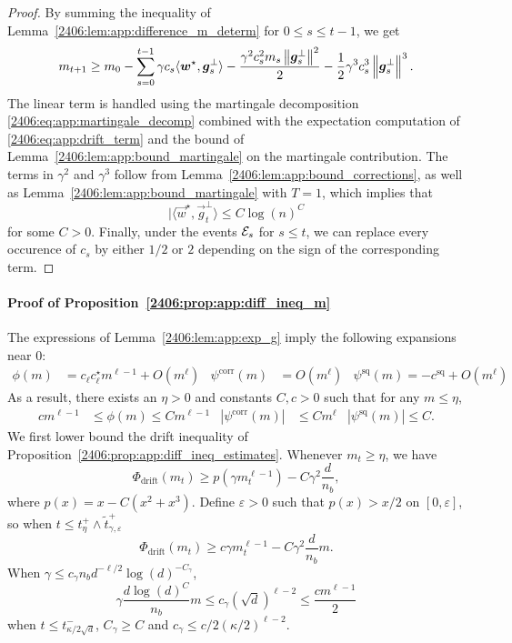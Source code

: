 \begin{proof}
    By summing the inequality of Lemma~\ref{2406:lem:app:difference_m_determ} for $0 \leq s \leq t-1$, we get
    \begin{equation}
        m_{t+1} \geq m_0 - \sum_{s=0}^{t-1} \gamma c_s \langle {\boldsymbol{w}}^\star,{\boldsymbol{g}}_s^\bot \rangle - \frac{\gamma^2 c_s^2 m_s \left\lVert {\boldsymbol{g}}_s^\bot\right\rVert^2}{2} - \frac12\gamma^3 c_s^3 \left\lVert {\boldsymbol{g}}_s^\bot\right\rVert^3.
    \end{equation}
    The linear term is handled using the martingale decomposition \eqref{2406:eq:app:martingale_decomp} combined with the expectation computation of \eqref{2406:eq:app:drift_term} and the bound of Lemma~\ref{2406:lem:app:bound_martingale} on the martingale contribution. The terms in $\gamma^2$ and $\gamma^3$ follow from Lemma~\ref{2406:lem:app:bound_corrections}, as well as Lemma~\ref{2406:lem:app:bound_martingale} with $T = 1$, which implies that
    \[ |\langle \vec{w}^\star, \vec{g}_t^\bot \rangle \leq C \log(n)^C \]
    for some $C > 0$.
    Finally, under the events $\mathcal{E}_s$ for $s\leq t$, we can replace every occurence of $c_s$ by either $1/2$ or $2$ depending on the sign of the corresponding term.
\end{proof}





\paragraph{Proof of Proposition~\ref{2406:prop:app:diff_ineq_m}} The expressions of Lemma~\ref{2406:lem:app:exp_g} imply the following expansions near 0:
\begin{align} 
\phi(m) &= c_{\ell}c_{\ell}^\star m^{\ell-1} + O(m^\ell) & \psi^{\mathrm{corr}}(m) &=  O(m^\ell) & \psi^{\mathrm{sq}}(m) = - c^{\mathrm{sq}} + O(m^\ell) \label{2406:eq:app:phi_psi_bounds}
\end{align} 
As a result, there exists an $\eta > 0$ and constants $C, c > 0$ such that for any $m \leq \eta$,
\begin{align*}
    c m^{\ell - 1} &\leq \phi(m) \leq C m^{\ell - 1} & |\psi^{\mathrm{corr}}(m)| &\leq C m^{\ell} & |\psi^{\mathrm{sq}}(m)| \leq C.
\end{align*}
We first lower bound the drift inequality of Proposition~\ref{2406:prop:app:diff_ineq_estimates}. Whenever $m_t \geq \eta$, we have
\[ \Phi_{\mathrm{drift}}(m_t) \geq p(\gamma m_t^{\ell - 1}) - C\gamma^2\frac{d}{n_b},  \]
where $p(x) = x - C(x^2 + x^3)$. Define $\varepsilon > 0$ such that $p(x) > x/2$ on $[0, \varepsilon]$, so when $t \leq t_{\eta}^+ \wedge \tilde t_{\gamma,\varepsilon}^+$
\[ \Phi_{\mathrm{drift}}(m_t) \geq c\gamma m_t^{\ell-1} - C \gamma^2 \frac{d}{n_b} m.\]
When $\gamma \leq c_\gamma n_b d^{-\ell/2} \log(d)^{-C_\gamma}$,
\[ \gamma \frac{d \log(d)^C }{n_b} m \leq c_\gamma (\sqrt{d})^{\ell-2} \leq \frac{cm^{\ell-1}}2 \]
when $t \leq t_{\kappa/2\sqrt{d}}^-$, $C_\gamma \geq C$ and $c_\gamma \leq c/2 (\kappa/2)^{\ell-2}$.

